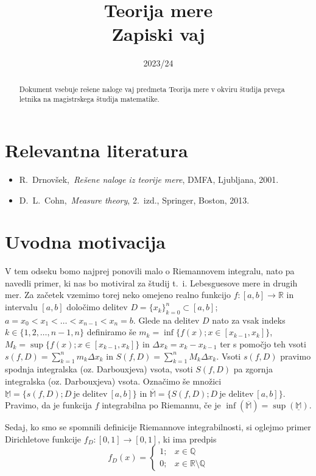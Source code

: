 \documentclass[a4paper, 10pt]{article}
\title{Teorija mere\\ Zapiski vaj}
\date{2023/24}
\newcommand{\mth}[1]{\ensuremath{\mathbb{#1}}}
\newcommand{\R}{\mth{R}}
\newcommand{\map}[3]{\ensuremath{{#1}: {#2} \rightarrow {#3}}}
\begin{document}
	\maketitle
	\newpage
	\begin{abstract}
		\noindent Dokument vsebuje rešene naloge vaj predmeta Teorija mere v okviru študija prvega letnika na magistrskega študija matematike.
	\end{abstract}
	\newpage
	\tableofcontents
	\newpage
	\section{Relevantna literatura}
	\begin{itemize}
		\item R.~Drnovšek,~\emph{Rešene naloge iz teorije mere}, DMFA, Ljubljana, 2001.
		\item D.~L.~Cohn,~\emph{Measure theory}, 2.~izd., Springer, Boston, 2013.
	\end{itemize}
	\section{Uvodna motivacija}
	V tem odseku bomo najprej ponovili malo o Riemannovem integralu, nato pa navedli primer, ki nas bo motiviral za študij t.~i. Lebesguesove mere in drugih mer.
	Za začetek vzemimo torej neko omejeno realno funkcijo \map{f}{[a, b]}{\R} in intervalu $[a, b]$ določimo delitev $D=\{x_k\}^n_{k=0} \subset [a, b]$; $a = x_0 < x_1 < \ldots < x_{n-1} < x_n = b$. Glede na delitev $D$ nato za vsak indeks $k \in \{1, 2, \ldots, n-1, n\}$ definiramo še $m_k = \inf\{f(x); x\in [x_{k-1}, x_k]\}$, $M_k = \sup\{f(x); x\in [x_{k-1}, x_k]\}$ in $\Delta x_k = x_k - x_{k-1}$ ter s pomočjo teh vsoti $s(f, D) = \sum_{k=1}^{n}m_k \Delta x_k$ in $S(f, D) = \sum_{k=1}^{n}M_k \Delta x_k$. Vsoti $s(f, D)$ pravimo spodnja integralska (oz. Darbouxjeva) vsota, vsoti $S(f, D)$ pa zgornja integralska (oz. Darbouxjeva) vsota.
	Označimo še množici $\underline{\mth{M}} = \{s(f, D); D~\text{je delitev}~[a, b]\}$ in $\overline{\mth{M}} = \{S(f, D); D~\text{je delitev}~[a, b]\}$. Pravimo, da je funkcija $f$ integrabilna po Riemannu, če je $\inf(\overline{\mth{M}}) = \sup(\underline{\mth{M}})$.
	
	Sedaj, ko smo se spomnili definicije Riemannove integrabilnosti, si oglejmo primer Dirichletove funkcije \map{f_D}{[0, 1]}{[0, 1]}, ki ima predpis \[f_D(x) = \begin{cases}
	1;& x\in \mth{Q} \\
	0;& x\in \R\setminus\mth{Q}
	\end{cases}\]
	
\end{document}
